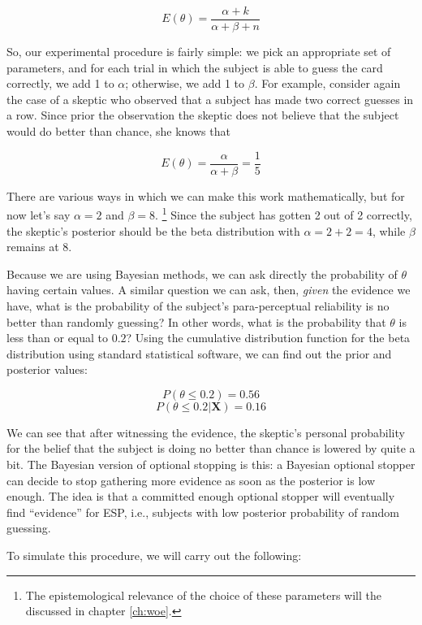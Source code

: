 \[E(\theta) = \frac{\alpha + k}{\alpha + \beta + n}\]

So, our experimental procedure is fairly simple: we pick an appropriate
set of parameters, and for each trial in which the subject is able to
guess the card correctly, we add 1 to \(\alpha\); otherwise, we add 1 to
\(\beta\). For example, consider again the case of a skeptic who
observed that a subject has made two correct guesses in a row. Since
prior the observation the skeptic does not believe that the subject
would do better than chance, she knows that

\[E(\theta) = \frac{\alpha}{\alpha + \beta} = \frac{1}{5}\]

There are various ways in which we can make this work mathematically,
but for now let's say \(\alpha = 2\) and \(\beta = 8\). \footnote{The epistemological relevance of the choice of these parameters will the discussed in chapter \ref{ch:woe}.} Since the
subject has gotten 2 out of 2 correctly, the skeptic's posterior should
be the beta distribution with \(\alpha= 2+2=4\), while \(\beta\) remains
at 8.

Because we are using Bayesian methods, we can ask directly the
probability of \(\theta\) having certain values. A similar question we
can ask, then, \emph{given} the evidence we have, what is the
probability of the subject's para-perceptual reliability is no better
than randomly guessing? In other words, what is the probability that
\(\theta\) is less than or equal to \(0.2\)? Using the cumulative
distribution function for the beta distribution using standard
statistical software, we can find out the prior and posterior values:

\[P(\theta \leq 0.2) = 0.56\] \[P(\theta \leq 0.2|\mathbf{X}) = 0.16\]

We can see that after witnessing the evidence, the skeptic's personal
probability for the belief that the subject is doing no better than
chance is lowered by quite a bit. The Bayesian version of optional
stopping is this: a Bayesian optional stopper can decide to stop
gathering more evidence as soon as the posterior is low enough. The idea
is that a committed enough optional stopper will eventually find
``evidence'' for ESP, i.e., subjects with low posterior probability of
random guessing.

To simulate this procedure, we will carry out the following:



